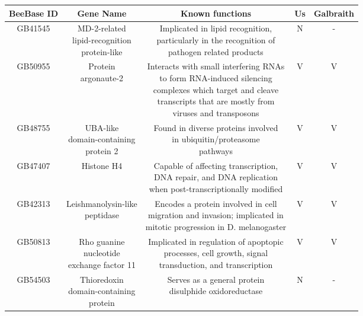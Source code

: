 \documentclass{bmcart}
\begin{document}
\begin{linenumbers}
\begin{backmatter}
\begin{table}[h!]
\begin{tabular}{ccccc}
\hline
BeeBase ID & Gene Name & Known functions & Us & Galbraith \\ 
\hline
GB41545 & \makecell{MD-2-related \\ lipid-recognition \\ protein-like} & \makecell{Implicated in lipid recognition, \\ particularly in the recognition of \\ pathogen related products} & N & - \\
\hline
GB50955 & \makecell{Protein \\ argonaute-2} & \makecell{Interacts with small interfering RNAs \\ to form RNA-induced silencing \\ complexes which target and cleave \\ transcripts that are mostly from \\ viruses and transposons} & V & V \\
\hline
GB48755 & \makecell{UBA-like \\ domain-containing \\ protein 2} & \makecell{Found in diverse proteins involved \\ in ubiquitin/proteasome \\ pathways} & V & V \\
\hline
GB47407 & Histone H4 & \makecell{Capable of affecting transcription, \\ DNA repair, and DNA replication \\ when post-transcriptionally modified} & V & V \\
\hline
GB42313 & \makecell{Leishmanolysin-like \\ peptidase} & \makecell{Encodes a protein involved in cell \\ migration and invasion; implicated in \\ mitotic progression in D. melanogaster} & V & V \\
\hline
GB50813 & \makecell{Rho guanine \\ nucleotide \\ exchange factor 11} & \makecell{Implicated in regulation of apoptopic \\ processes, cell growth, signal \\ transduction, and transcription} & V & V \\
\hline
GB54503 & \makecell{Thioredoxin \\ domain-containing \\ protein} & \makecell{Serves as a general protein \\ disulphide oxidoreductase} & N & - \\

\end{tabular}
\end{table}
\end{backmatter}
\end{linenumbers}
\end{document}
